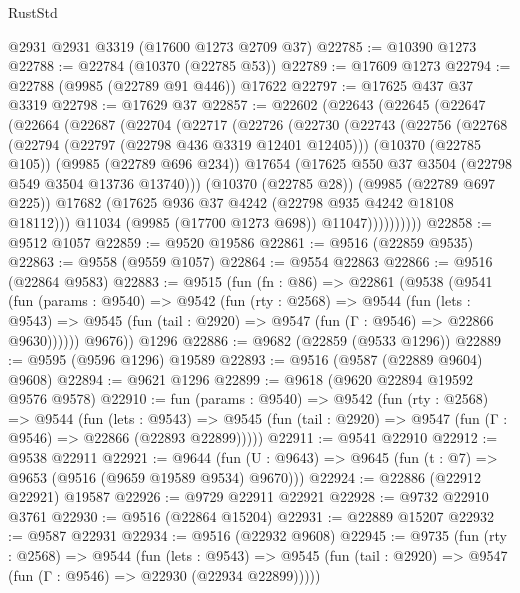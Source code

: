 \begin{lexlean}{RustStd}
\begin{coremodule}
    @2931
    @2931
    @3319
    (@17600 @1273 @2709 @37)
@22785 := @10390 @1273
@22788 := @22784 (@10370 (@22785 @53))
@22789 := @17609 @1273
@22794 := @22788 (@9985 (@22789 @91 @446)) @17622
@22797 := @17625 @437 @37 @3319
@22798 := @17629 @37
@22857 := @22602
    (@22643
      (@22645
        (@22647
          (@22664
            (@22687
              (@22704
                (@22717
                  (@22726
                    (@22730
                      (@22743
                        (@22756
                          (@22768
                            (@22794 (@22797 (@22798 @436 @3319 @12401 @12405)))
                            (@10370 (@22785 @105))
                            (@9985 (@22789 @696 @234))
                            @17654
                            (@17625 @550 @37 @3504 (@22798 @549 @3504 @13736 @13740)))
                          (@10370 (@22785 @28))
                          (@9985 (@22789 @697 @225))
                          @17682
                          (@17625 @936 @37 @4242 (@22798 @935 @4242 @18108 @18112)))
                        @11034
                        (@9985 (@17700 @1273 @698))
                        @11047))))))))))
@22858 := @9512 @1057
@22859 := @9520 @19586
@22861 := @9516 (@22859 @9535)
@22863 := @9558 (@9559 @1057)
@22864 := @9554 @22863
@22866 := @9516 (@22864 @9583)
@22883 := @9515
    (fun (fn : @86) =>
    @22861
      (@9538
        (@9541
          (fun (params : @9540) =>
          @9542
            (fun (rty : @2568) =>
            @9544
              (fun (lets : @9543) =>
              @9545 (fun (tail : @2920) => @9547 (fun (Γ : @9546) => @22866 @9630))))))
        @9676))
    @1296
@22886 := @9682 (@22859 (@9533 @1296))
@22889 := @9595 (@9596 @1296) @19589
@22893 := @9516 (@9587 (@22889 @9604) @9608)
@22894 := @9621 @1296
@22899 := @9618 (@9620 @22894 @19592 @9576 @9578)
@22910 := fun (params : @9540) =>
  @9542
    (fun (rty : @2568) =>
    @9544
      (fun (lets : @9543) =>
      @9545 (fun (tail : @2920) => @9547 (fun (Γ : @9546) => @22866 (@22893 @22899)))))
@22911 := @9541 @22910
@22912 := @9538 @22911
@22921 := @9644
    (fun (U : @9643) => @9645 (fun (t : @7) => @9653 (@9516 (@9659 @19589 @9534) @9670)))
@22924 := @22886 (@22912 @22921) @19587
@22926 := @9729 @22911 @22921
@22928 := @9732 @22910 @3761
@22930 := @9516 (@22864 @15204)
@22931 := @22889 @15207
@22932 := @9587 @22931
@22934 := @9516 (@22932 @9608)
@22945 := @9735
    (fun (rty : @2568) =>
    @9544
      (fun (lets : @9543) =>
      @9545 (fun (tail : @2920) => @9547 (fun (Γ : @9546) => @22930 (@22934 @22899)))))

\end{coremodule}
\end{lexlean}

